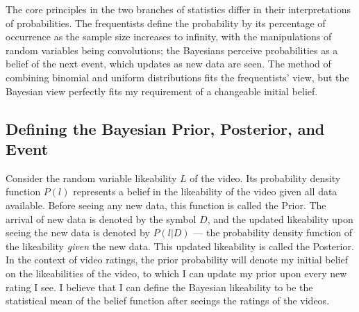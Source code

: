 \documentclass[a4paper,11pt]{article}
\begin{document}
The core principles in the two branches of statistics differ in their interpretations of probabilities. The frequentists define the probability by its percentage of occurrence as the sample size increases to infinity, with the manipulations of random variables being convolutions; the Bayesians perceive probabilities as a belief of the next event, which updates as new data are seen. The method of combining binomial and uniform distributions fits the frequentists' view, but the Bayesian view perfectly fits my requirement of a changeable initial belief.

\subsection{Defining the Bayesian Prior, Posterior, and Event}
Consider the random variable likeability $L$ of the video. Its probability density function $P(l)$ represents a belief in the likeability of the video given all data available. Before seeing any new data, this function is called the Prior. The arrival of new data is denoted by the symbol $D$, and the updated likeability upon seeing the new data is denoted by $P(l | D)$ --- the probability density function of the likeability \textit{given} the new data. This updated likeability is called the Posterior. In the context of video ratings, the prior probability will denote my initial belief on the likeabilities of the video, to which I can update my prior upon every new rating I see. I believe that I can define the Bayesian likeability to be the statistical mean of the belief function after seeings the ratings of the videos.



\end{document}
